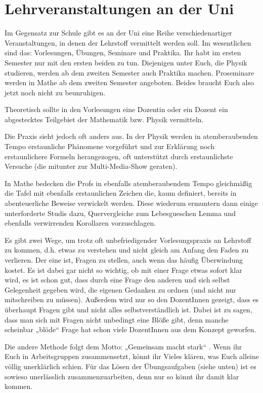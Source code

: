 \section{Lehrveranstaltungen an der Uni}
Im Gegensatz zur Schule gibt es an der Uni eine Reihe verschiedenartiger
Veranstaltungen, in denen der Lehrstoff vermittelt werden soll. Im wesentlichen
sind das: Vorlesungen, Übungen, Seminare und Praktika. Ihr habt im ersten
Semester nur mit den ersten beiden zu tun. Diejenigen unter Euch, die Physik
studieren, werden ab dem zweiten Semester auch Praktika machen. Proseminare
werden in Mathe ab dem zweiten Semester angeboten. Beides braucht Euch also
jetzt noch nicht zu beunruhigen.

Theoretisch sollte in den Vorlesungen eine Dozentin oder ein Dozent ein abgestecktes Teilgebiet der Mathematik bzw. Physik vermitteln.

Die Praxis sieht jedoch oft anders aus. In der Physik werden in atemberaubenden
Tempo erstaunliche Phänomene vorgeführt und zur Erklärung noch erstaunlichere
Formeln herangezogen, oft unterstützt durch erstaunlichste Versuche (die
mitunter zur Multi-Media-Show geraten).

In Mathe bedecken die Profs in ebenfalls atemberaubendem Tempo gleichmäßig die
Tafel mit ebenfalls erstaunlichen Zeichen die, kaum definiert, bereits in
abenteuerliche Beweise verwickelt werden.  Diese wiederum ermuntern dann einige
unterforderte Studis dazu, Quervergleiche zum Lebesgueschen Lemma und ebenfalls
verwirrenden Korollaren vorzuschlagen.

Es gibt zwei Wege, um trotz oft unbefriedigender Vorlesungspraxis an Lehrstoff
zu kommen, d.h.  etwas zu verstehen und nicht gleich am Anfang den Faden zu
verlieren. Der eine ist, Fragen zu stellen, auch wenn das häufig Überwindung
kostet. Es ist dabei gar nicht so wichtig, ob mit einer Frage etwas sofort klar
wird, es ist schon gut, dass durch eine Frage den anderen und sich selbst
Gelegenheit gegeben wird, die eigenen Gedanken zu ordnen (und nicht nur
mitschreiben zu müssen).  Außerdem wird nur so den DozentInnen gezeigt, dass es
überhaupt Fragen gibt und nicht alles selbstverständlich ist. Dabei ist zu
sagen, dass man sich mit Fragen nicht unbedingt eine Blöße gibt, denn manche
scheinbar „blöde“ Frage hat schon viele DozentInnen aus dem Konzept geworfen.

Die andere Methode folgt dem Motto: „Gemeinsam macht stark“ . Wenn ihr Euch in
Arbeitsgruppen zusammensetzt, könnt ihr Vieles klären, was Euch alleine völlig
unerklärlich schien. Für das Lösen der Übungsaufgaben (siehe unten) ist es
sowieso unerlässlich zusammenzuarbeiten, denn nur so könnt ihr damit klar
kommen.

